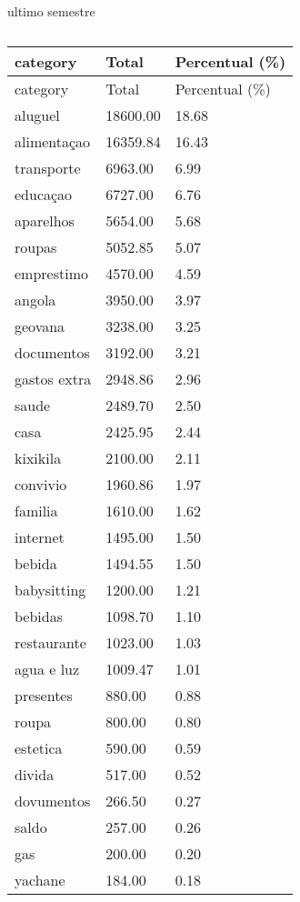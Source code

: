 \documentclass[
  8pt,
  a4paper,
  DIV=11,
  numbers=noendperiod]{scrartcl}
\begin{document}
\begin{figure}
\begin{minipage}{0.50\linewidth}
\end{minipage}%
%
\begin{minipage}{0.50\linewidth}
ultimo semestre

\begin{longtable}[]{@{}lll@{}}
\caption{}\label{T_a9848}\tabularnewline
\toprule\noalign{}
category & Total & Percentual (\%) \\
\midrule\noalign{}
\endfirsthead
\toprule\noalign{}
category & Total & Percentual (\%) \\
\midrule\noalign{}
\endhead
\bottomrule\noalign{}
\endlastfoot
aluguel & 18600.00 & 18.68 \\
alimentaçao & 16359.84 & 16.43 \\
transporte & 6963.00 & 6.99 \\
educaçao & 6727.00 & 6.76 \\
aparelhos & 5654.00 & 5.68 \\
roupas & 5052.85 & 5.07 \\
emprestimo & 4570.00 & 4.59 \\
angola & 3950.00 & 3.97 \\
geovana & 3238.00 & 3.25 \\
documentos & 3192.00 & 3.21 \\
gastos extra & 2948.86 & 2.96 \\
saude & 2489.70 & 2.50 \\
casa & 2425.95 & 2.44 \\
kixikila & 2100.00 & 2.11 \\
convivio & 1960.86 & 1.97 \\
familia & 1610.00 & 1.62 \\
internet & 1495.00 & 1.50 \\
bebida & 1494.55 & 1.50 \\
babysitting & 1200.00 & 1.21 \\
bebidas & 1098.70 & 1.10 \\
restaurante & 1023.00 & 1.03 \\
agua e luz & 1009.47 & 1.01 \\
presentes & 880.00 & 0.88 \\
roupa & 800.00 & 0.80 \\
estetica & 590.00 & 0.59 \\
divida & 517.00 & 0.52 \\
dovumentos & 266.50 & 0.27 \\
saldo & 257.00 & 0.26 \\
gas & 200.00 & 0.20 \\
yachane & 184.00 & 0.18 \\

\end{longtable}
\end{minipage}
\end{figure}
\end{document}
